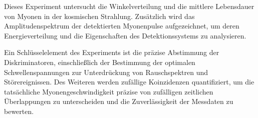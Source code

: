 Dieses Experiment untersucht die Winkelverteilung und die mittlere Lebensdauer von Myonen in der kosmischen Strahlung. Zusätzlich wird das Amplitudenspektrum der detektierten Myonenpulse aufgezeichnet, um deren Energieverteilung und die Eigenschaften des Detektionssystems zu analysieren.

Ein Schlüsselelement des Experiments ist die präzise Abstimmung der Diskriminatoren, einschließlich der Bestimmung der optimalen Schwellenspannungen zur Unterdrückung von Rauschspektren und Störereignissen. Des Weiteren werden zufällige Koinzidenzen quantifiziert, um die tatsächliche Myonengeschwindigkeit präzise von zufälligen zeitlichen Überlappungen zu unterscheiden und die Zuverlässigkeit der Messdaten zu bewerten.